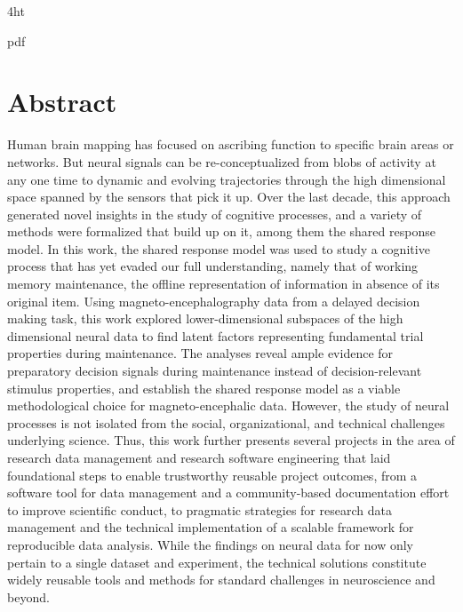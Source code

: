 \documentclass[
  a4paper,  %
  twoside,  %
  bibliography=totoc,
  headsepline,
  cleardoublepage=empty,
  parskip=half,
  draft=false
]{scrbook}
\begin{document}
\iftex4ht
  \Configure{$}{\PicMath}{\EndPicMath}{}

  {pdf}
  {%
  }
\fi



\Titelblatt

\pagestyle{preamble}
\renewcommand*{\chapterpagestyle}{preamble}



\section*{Abstract}

Human brain mapping has focused on ascribing function to specific brain areas or networks.
But neural signals can be re-conceptualized from blobs of activity at any one time to dynamic and evolving trajectories through the high dimensional space spanned by the sensors that pick it up.
Over the last decade, this approach generated novel insights in the study of cognitive processes, and a variety of methods were formalized that build up on it, among them the shared response model.
In this work, the shared response model was used to study a cognitive process that has yet evaded our full understanding, namely that of working memory maintenance, the offline representation of information in absence of its original item.
Using magneto-encephalography data from a delayed decision making task, this work explored lower-dimensional subspaces of the high dimensional neural data to find latent factors representing fundamental trial properties during maintenance.
The analyses reveal ample evidence for preparatory decision signals during maintenance instead of decision-relevant stimulus properties, and establish the shared response model as a viable methodological choice for magneto-encephalic data.
However, the study of neural processes is not isolated from the social, organizational, and technical challenges underlying science.
Thus, this work further presents several projects in the area of research data management and research software engineering that laid foundational steps to enable trustworthy reusable project outcomes, from a software tool for data management and a community-based documentation effort to improve scientific conduct, to pragmatic strategies for research data management and the technical implementation of a scalable framework for reproducible data analysis.
While the findings on neural data for now only pertain to a single dataset and experiment, the technical solutions constitute widely reusable tools and methods for standard challenges in neuroscience and beyond.
\end{document}
